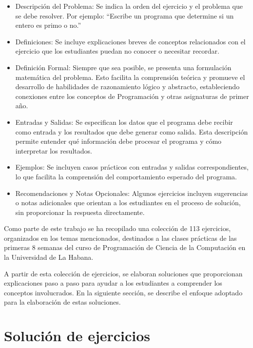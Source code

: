 \documentclass{article}
\begin{document}
\begin{itemize}
    \item Descripción del Problema:  
    Se indica la orden del ejercicio y el problema que se debe resolver. Por ejemplo: ``Escribe un programa que determine si un entero es primo o no.''

    \item Definiciones: 
    Se incluye explicaciones breves de conceptos relacionados con el ejercicio que los estudiantes puedan no conocer o necesitar recordar.

    \item Definición Formal:
    Siempre que sea posible, se presenta una formulación matemática del problema. Esto facilita la comprensión teórica y promueve el desarrollo de habilidades de razonamiento lógico y abstracto, estableciendo conexiones entre los conceptos de Programación y otras asignaturas de primer año.
    
    \item Entradas y Salidas:
    Se especifican los datos que el programa debe recibir como entrada y los resultados que debe generar como salida. Esta descripción permite entender qué información debe procesar el programa y cómo interpretar los resultados.

    \item Ejemplos:
    Se incluyen casos prácticos con entradas y salidas correspondientes, lo que facilita la comprensión del comportamiento esperado del programa.
    
    \item Recomendaciones y Notas Opcionales:  
     Algunos ejercicios incluyen sugerencias o notas adicionales que orientan a los estudiantes en el proceso de solución, sin proporcionar la respuesta directamente.
\end{itemize}

Como parte de este trabajo se ha recopilado una colección de 113 ejercicios, organizados en los temas mencionados, destinados a las clases prácticas de las primeras 8 semanas del curso de Programación de Ciencia de la Computación en la Universidad de La Habana.

A partir de esta colección de ejercicios, se elaboran soluciones que proporcionan explicaciones paso a paso para ayudar a los estudiantes a comprender los conceptos involucrados. En la siguiente sección, se describe el enfoque adoptado para la elaboración de estas soluciones.

\section{Solución de ejercicios}
\end{document}
